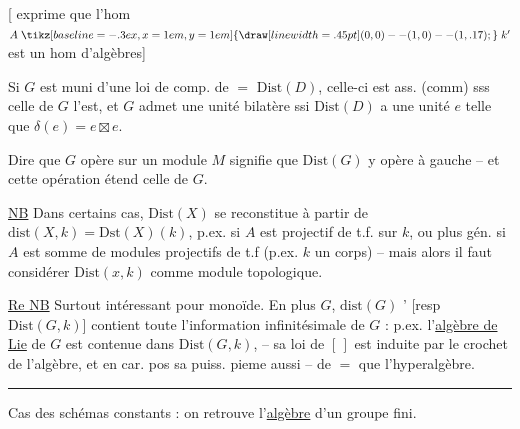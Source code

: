 [ exprime que l'hom $A\mathrel{\tikz[baseline=-.3ex,x=1em,y=1em]{\draw[line width=.45pt] (0,0)--(1,0)--(1,.17);}}k'$ est un hom d'algèbres]

Si $G$ est muni d'une loi de comp. de $=$ $\mathrm{Dist}(D)$, celle-ci est ass. (comm) sss celle de $G$ l'est, et  $G$ admet une unité bilatère ssi $\mathrm{Dist}(D)$ a une unité  $e$ telle que $\delta(e)=e\boxtimes e$.

Dire que $G$ opère sur un module $M$  signifie que $\mathrm{Dist}(G)$ y opère à gauche -- et cette opération étend celle de $G$.

\uline{NB} Dans certains cas, $\mathrm{Dist}(X)$ se reconstitue à partir de $\mathrm{dist}(X,k)=\mathrm{Dst}(X)(k)$, p.ex. si $A$ est  projectif de t.f. sur $k$, ou plus gén. si $A$ est somme de modules projectifs de t.f (p.ex.  $k$ un corps) -- mais alors il faut considérer $\mathrm{Dist}(x,k)$ comme module topologique.

\uline{Re NB} Surtout intéressant pour monoïde. En plus   $G$, $\mathrm{dist}(G)$ ' [resp $\mathrm{Dist}(G,k)$] contient toute l'information infinitésimale de $G$ : p.ex. l'\uline{algèbre de Lie} de $G$ est contenue dans $\mathrm{Dist}(G,k)$, --  sa loi de $[\,]$ est induite par le crochet de l'algèbre, et en car. pos sa puiss. pieme aussi -- de $=$ que l'hyperalgèbre.

\begin{center}\rule{1.6cm}{0.55pt}\end{center}
Cas des schémas constants : on retrouve l'\uline{algèbre} d'un groupe fini.

